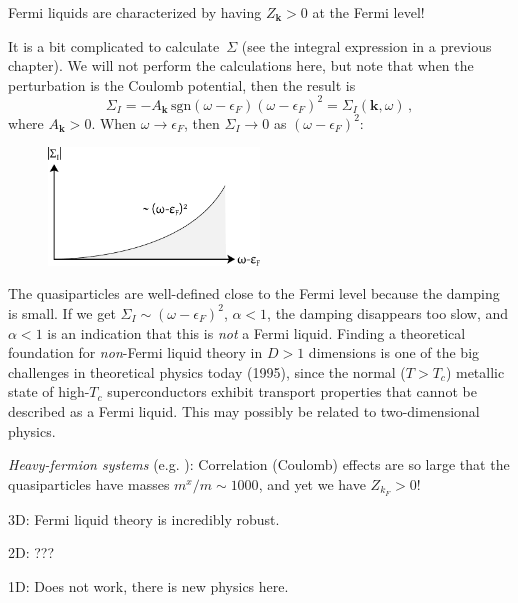 \clearpage



\begin{Indent}
  Fermi liquids are characterized by having $Z_{\bm k} > 0$ at the Fermi level!
\end{Indent}
It is a bit complicated to calculate~$\Sigma$ (see the integral expression in a previous chapter).
We will not perform the calculations here, but note that when the perturbation is the Coulomb potential, then the result is
\[
  \Sigma_I = -A_{\bm k}\, \mathrm{sgn}(\omega-\epsilon_F) (\omega-\epsilon_F)^2 = \Sigma_I(\bm k, \omega) \,,
\]
where $A_{\bm k} > 0$.
When $\omega \rightarrow \epsilon_F$, then $\Sigma_I \rightarrow 0$ as $(\omega-\epsilon_F)^2$:

\begin{figure}[H]
  \centering
  \includegraphics[width=0.5\textwidth]{img/pp181-200_selfenergy.pdf}
\end{figure}

The quasiparticles are well-defined close to the Fermi level because the damping is small.
If we get $\Sigma_I \sim (\omega-\epsilon_F)^2$, $\alpha < 1$, the damping disappears too slow, and $\alpha < 1$ is an indication that this is \emph{not} a Fermi liquid.
Finding a theoretical foundation for \emph{non}-Fermi liquid theory in $D>1$ dimensions is one of the big challenges in theoretical physics today (1995), since the normal ($T>T_c$) metallic state of high-$T_c$ superconductors exhibit transport properties that cannot be described as a Fermi liquid.
This may possibly be related to two-dimensional physics.

\emph{Heavy-fermion systems} (e.g. ): Correlation (Coulomb) effects are so large that the quasiparticles have masses $m^x/m \sim 1000$, and yet we have $Z_{k_F} > 0$!

3D: Fermi liquid theory is incredibly robust.

2D: ???

1D: Does not work, there is new physics here.



\clearpage
